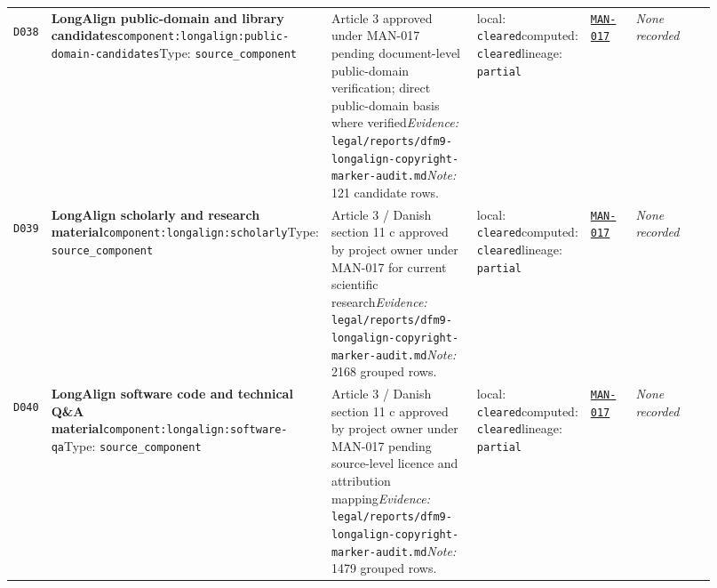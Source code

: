 \documentclass[9pt,a4paper]{article}
\newcommand{\depid}[1]{\hypertarget{dep:#1}{\texttt{#1}}}
\begin{document}
\begin{landscape}
\begin{longtable}{@{}L{0.035\linewidth}L{0.185\linewidth}L{0.27\linewidth}L{0.09\linewidth}L{0.10\linewidth}L{0.24\linewidth}@{}}
\depid{D038} & \textbf{LongAlign public-domain and library candidates}\newline \nolinkurl{component:longalign:public-domain-candidates}\newline Type: \texttt{source\_component} & Article 3 approved under MAN-017 pending document-level public-domain verification; direct public-domain basis where verified\newline \textit{Evidence:} \nolinkurl{legal/reports/dfm9-longalign-copyright-marker-audit.md}\newline \textit{Note:} 121 candidate rows. & local: \texttt{cleared}\newline computed: \texttt{cleared}\newline lineage: \texttt{partial} & \hyperlink{manual:MAN-017}{\texttt{MAN-017}} & \textit{None recorded} \\
\depid{D039} & \textbf{LongAlign scholarly and research material}\newline \nolinkurl{component:longalign:scholarly}\newline Type: \texttt{source\_component} & Article 3 / Danish section 11 c approved by project owner under MAN-017 for current scientific research\newline \textit{Evidence:} \nolinkurl{legal/reports/dfm9-longalign-copyright-marker-audit.md}\newline \textit{Note:} 2168 grouped rows. & local: \texttt{cleared}\newline computed: \texttt{cleared}\newline lineage: \texttt{partial} & \hyperlink{manual:MAN-017}{\texttt{MAN-017}} & \textit{None recorded} \\
\depid{D040} & \textbf{LongAlign software code and technical Q\&A material}\newline \nolinkurl{component:longalign:software-qa}\newline Type: \texttt{source\_component} & Article 3 / Danish section 11 c approved by project owner under MAN-017 pending source-level licence and attribution mapping\newline \textit{Evidence:} \nolinkurl{legal/reports/dfm9-longalign-copyright-marker-audit.md}\newline \textit{Note:} 1479 grouped rows. & local: \texttt{cleared}\newline computed: \texttt{cleared}\newline lineage: \texttt{partial} & \hyperlink{manual:MAN-017}{\texttt{MAN-017}} & \textit{None recorded} \\

\end{longtable}
\end{landscape}
\end{document}
